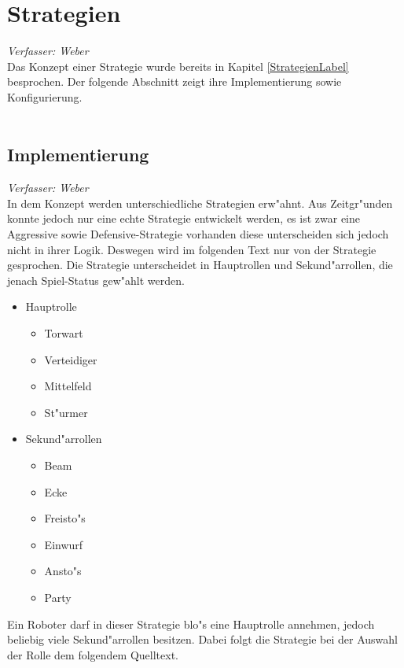 \documentclass[fontsize=12pt,a4paper,final]{scrartcl}[2003/01/01]
\begin{document}
\section{Strategien}
\textit{Verfasser: Weber}\\
Das Konzept einer Strategie wurde bereits in Kapitel \ref{StrategienLabel} besprochen. Der folgende Abschnitt zeigt ihre Implementierung sowie Konfigurierung.\\
\\
\subsection{Implementierung}
\textit{Verfasser: Weber}\\
In dem Konzept werden unterschiedliche Strategien erw"ahnt. Aus Zeitgr"unden konnte jedoch nur eine echte Strategie entwickelt werden, es ist zwar eine Aggressive sowie Defensive-Strategie vorhanden diese unterscheiden sich jedoch nicht in ihrer Logik. Deswegen wird im folgenden Text nur von der Strategie gesprochen. Die Strategie unterscheidet in Hauptrollen und Sekund"arrollen, die jenach Spiel-Status gew"ahlt werden.

\begin{itemize}

\item Hauptrolle
\begin{itemize}
\item Torwart
\item Verteidiger
\item Mittelfeld
\item St"urmer
\end{itemize}

\item Sekund"arrollen
\begin{itemize}
\item Beam
\item Ecke
\item Freisto"s
\item Einwurf
\item Ansto"s
\item Party

\end{itemize}
\end{itemize}

Ein Roboter darf in dieser Strategie blo"s eine Hauptrolle annehmen, jedoch beliebig viele Sekund"arrollen besitzen. Dabei folgt die Strategie bei der Auswahl der Rolle dem folgendem Quelltext.\\
\end{document}
